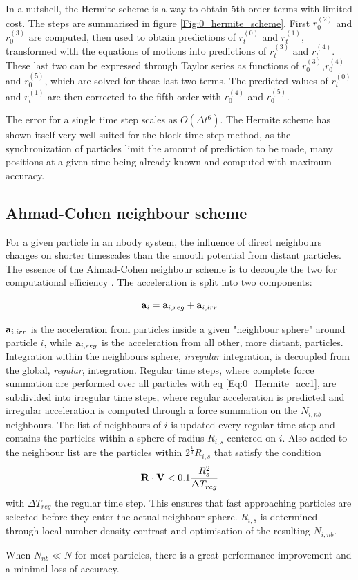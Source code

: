 In a nutshell, the Hermite scheme is a way to obtain 5th order terms with limited cost. The steps are summarised in figure \ref{Fig:0_hermite_scheme}. First $r_0^{(2)}$ and $r_0^{(3)}$ are computed, then used to obtain predictions of $r_t^{(0)}$ and $r_t^{(1)}$, transformed with the equations of motions into predictions of $r_t^{(3)}$ and $r_t^{(4)}$. These last two can be expressed through Taylor series as functions of $r_0^{(3)}$,$r_0^{(4)}$ and $r_0^{(5)}$, which are solved for these last two terms. The predicted values of $r_t^{(0)}$ and $r_t^{(1)}$ are then corrected to the fifth order with $r_0^{(4)}$ and $r_0^{(5)}$.

The error for a single time step scales as $O(\Delta t^6)$. The Hermite scheme has shown itself very well suited for the block time step method, as the synchronization of particles limit the amount of prediction to be made, many positions at a given time being already known and computed with maximum accuracy.


\subsection{Ahmad-Cohen neighbour scheme}

For a given particle in an nbody system, the influence of direct neighbours changes on shorter timescales than the smooth potential from distant particles. The essence of the Ahmad-Cohen neighbour scheme is to decouple the two for computational efficiency \citep{AhmadCohen1973}. The acceleration is split into two components:

\begin{equation}
\bold{a}_i = \bold{a}_{i,reg} + \bold{a}_{i,irr}
\end{equation}

$\bold{a}_{i,irr}$ is the acceleration from particles inside a given "neighbour sphere" around particle $i$, while $\bold{a}_{i,reg}$ is the acceleration from all other, more distant, particles. Integration within the neighbours sphere,  \textit{irregular} integration, is decoupled from the global, \textit{regular}, integration. Regular time steps, where complete force summation are performed over all particles with eq \ref{Eq:0_Hermite_acc1}, are subdivided into irregular time steps, where regular acceleration is predicted and irregular acceleration is computed through a force summation on the $N_{i,nb}$ neighbours. The list of neighbours of $i$ is updated every regular time step and contains the particles within a sphere of radius $R_{i,s}$ centered on $i$. Also added to the neighbour list are the particles within $2^{\frac{1}{3}}R_{i,s} $ that satisfy the condition
\begin{equation}
\bold{R} \cdot \bold{V} < 0.1 \frac{R_s^2}{\Delta T_{reg}}
\end{equation}
with $\Delta T_{reg}$ the regular time step. This ensures that fast approaching particles are selected before they enter the actual neighbour sphere. $R_{i,s}$ is determined through local number density contrast and optimisation of the resulting $N_{i,nb}$. 

When $N_{nb} \ll N$ for most particles, there is a great performance improvement and a minimal loss of accuracy. 












